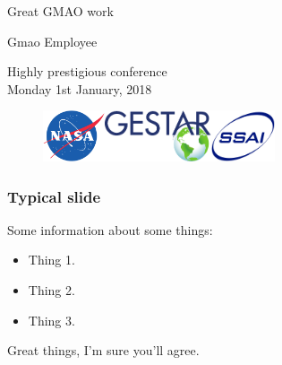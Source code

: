 \documentclass[aspectratio=169]{beamer}
\begin{document}

{

\begin{frame} 

\vspace{5mm}
\begin{center}
{\Large {\titlecolor Great GMAO work} } 
\end{center}

\vspace{-5mm}
\begin{center}
Gmao Employee 
\end{center}

\begin{center}
\footnotesize{Highly prestigious conference \\ Monday 1st January, 2018}
\end{center}

\vspace{0.25mm}

\begin{center}
\begin{figure}
\includegraphics[height=1.5cm]{nasa.png}\hspace{1.5cm}\includegraphics[height=1.5cm]{GESTAR.pdf}\hspace{1.5cm}\includegraphics[height=1.5cm]{SSAI.jpg}
\end{figure}
\end{center}

\end{frame}
}


\begin{frame}\frametitle{Typical slide}

Some information about some things:

\begin{itemize}
\item Thing 1.
\item Thing 2.
\item Thing 3.
\end{itemize}

Great things, I'm sure you'll agree.

\end{frame}


\end{document}

